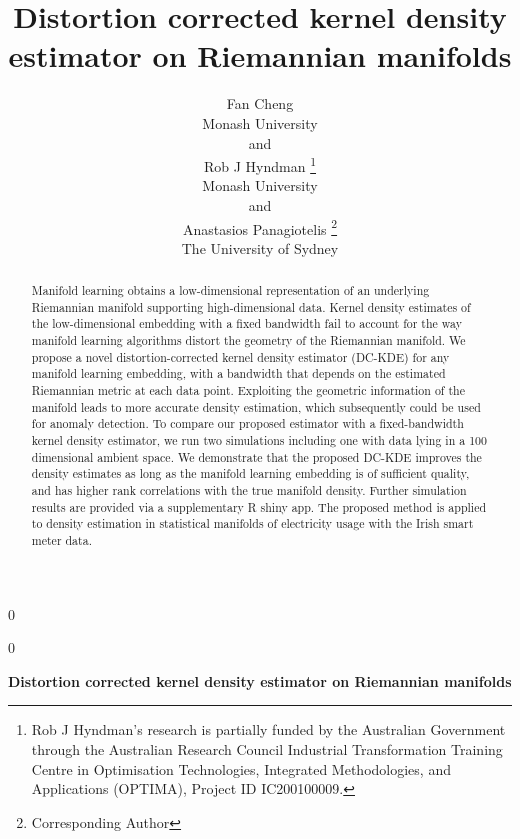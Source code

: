 \documentclass[12pt]{article}
\newcommand{\blind}{0}
\begin{document}
\def\spacingset#1{\renewcommand{\baselinestretch}%
  {#1}\small\normalsize} \spacingset{1}



\blind
  {
    \title{\bf Distortion corrected kernel density estimator on Riemannian manifolds}

    \author{
            Fan Cheng \\
      Monash University\\
       and \\       Rob J Hyndman \thanks{Rob J Hyndman's research is partially funded by the Australian Government through the Australian Research Council Industrial Transformation Training Centre in Optimisation Technologies, Integrated Methodologies, and Applications (OPTIMA), Project ID IC200100009.} \\
      Monash University\\
       and \\       Anastasios Panagiotelis \thanks{Corresponding Author} \\
      The University of Sydney\\
          }
    \maketitle
  } \fi

\blind
  {
    \bigskip
    \bigskip
    \bigskip
    \begin{center}
      {\LARGE\bf Distortion corrected kernel density estimator on Riemannian manifolds}
    \end{center}
    \medskip
  } \fi

\bigskip
\begin{abstract}
  Manifold learning obtains a low-dimensional representation of an underlying Riemannian manifold supporting high-dimensional data. Kernel density estimates of the low-dimensional embedding with a fixed bandwidth fail to account for the way manifold learning algorithms distort the geometry of the Riemannian manifold. We propose a novel distortion-corrected kernel density estimator (DC-KDE) for any manifold learning embedding, with a bandwidth that depends on the estimated Riemannian metric at each data point. Exploiting the geometric information of the manifold leads to more accurate density estimation, which subsequently could be used for anomaly detection. To compare our proposed estimator with a fixed-bandwidth kernel density estimator, we run two simulations including one with data lying in a 100 dimensional ambient space. We demonstrate that the proposed DC-KDE improves the density estimates as long as the manifold learning embedding is of sufficient quality, and has higher rank correlations with the true manifold density. Further simulation results are provided via a supplementary R shiny app. The proposed method is applied to density estimation in statistical manifolds of electricity usage with the Irish smart meter data.
\end{abstract}
\end{document}

